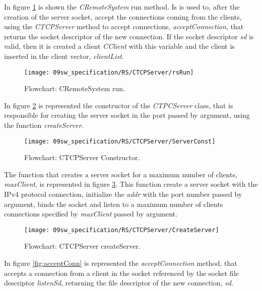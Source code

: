 In figure \ref{fig:rsRun} is shown the \textit{CRemoteSystem} run method. Is is used to, after the creation of the server socket, accept the connections coming from the clients, using the \textit{CTCPServer} method to accept connections, \textit{acceptConnection}, that returns the socket descriptor of the new connection. If the socket descriptor \textit{sd} is valid, then it is created a client \textit{CClient} with this variable and the client is inserted in the client vector, \textit{clientList}.

\begin{figure}[H]
	\centering
	\texttt{[image: 09sw\_specification/RS/CTCPServer/rsRun]}
	\caption{Flowchart: CRemoteSystem run.}
	\label{fig:rsRun}
\end{figure}


In figure \ref{fig:ServerConst} is represented the constructor of the \textit{CTPCServer} class, that is responsible for creating the server socket in the port passed by argument, using the function \textit{createServer}.

\begin{figure}[H]
	\centering
	\texttt{[image: 09sw\_specification/RS/CTCPServer/ServerConst]}
	\caption{Flowchart: CTCPServer Constructor.}
	\label{fig:ServerConst}
\end{figure}

The function that creates a server socket for a maximum number of clients, \textit{maxClient}, is represented in figure \ref{fig:RSCreateServer}. This function create a server socket with the IPv4 protocol connection, initialize the \textit{addr} with the port number passed by argument, binds the socket and listen to a maximum number of clients connections specified by \textit{maxClient} passed by argument.

\begin{figure}[H]
	\centering
	\texttt{[image: 09sw\_specification/RS/CTCPServer/CreateServer]}
	\caption{Flowchart: CTCPServer createServer.}
	\label{fig:RSCreateServer}
\end{figure}

In figure \ref{fig:acceptConn} is represented the \textit{acceptConnection} method, that accepts a connection from a client in the socket referenced by the socket file descriptor \textit{listenSd}, returning the file descriptor of the new connection, \textit{sd}.

